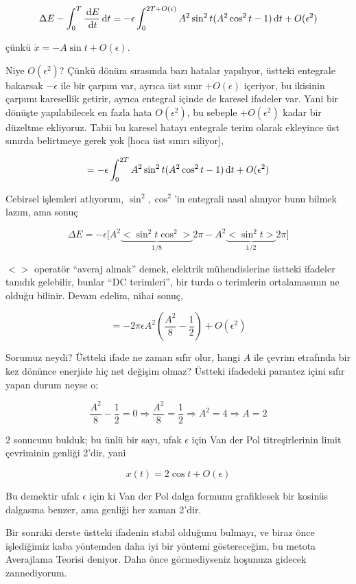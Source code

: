 \documentclass[12pt,fleqn]{article}\usepackage{../../common}
\begin{document}
$$
\Delta E - \int _{0}^{T} \frac{\,\mathrm{d} E}{\,\mathrm{d} t} \,\mathrm{d} t =
-\epsilon \int _{0}^{2T +O(\epsilon)} A^2 \sin^2 t(A^2\cos^2 t - 1) \,\mathrm{d} t + O(\epsilon^2)
$$

çünkü $\dot{x} = -A\sin t + O(\epsilon)$. 

Niye $O(\epsilon^2)$? Çünkü dönüm sırasında bazı hatalar yapılıyor, üstteki
entegrale bakarsak $-\epsilon$ ile bir çarpım var, ayrıca üst sınır
$+O(\epsilon)$ içeriyor, bu ikisinin çarpımı karesellik getirir, ayrıca entegral
içinde de karesel ifadeler var. Yani bir dönüşte yapılabilecek en fazla hata
$O(\epsilon^2)$, bu sebeple $+O(\epsilon^2)$ kadar bir düzeltme ekliyoruz. Tabii
bu karesel hatayı entegrale terim olarak ekleyince üst sınırda belirtmeye gerek
yok [hoca üst sınırı siliyor],

$$ = -\epsilon \int _{0}^{2T} A^2 \sin^2 t(A^2\cos^2 t - 1) \,\mathrm{d} t + O(\epsilon^2) $$

Cebirsel işlemleri atlıyorum, $\sin^2, \cos^2$'in entegrali nasıl alınıyor bunu
bilmek lazım, ama sonuç

$$ \Delta E = -\epsilon
\bigg[
A^2 \underbrace{<\sin^2 t \cos^2>}_{1/8} 2\pi - A^2 \underbrace{<\sin^2 t>}_{1/2} 2\pi
\bigg]
$$

$<>$ operatör ``averaj almak'' demek, elektrik mühendislerine üstteki ifadeler
tanıdık gelebilir, bunlar ``DC terimleri'', bir turda o terimlerin ortalamasının
ne olduğu bilinir. Devam edelim, nihai sonuç,

$$ = -2\pi \epsilon A^2 (\frac{A^2}{8}-\frac{1}{2}) + O(\epsilon^2) $$

Sorumuz neydi? Üstteki ifade ne zaman sıfır olur, hangi $A$ ile çevrim etrafında
bir kez dönünce enerjide hiç net değişim olmaz? Üstteki ifadedeki parantez içini
sıfır yapan durum neyse o; 

$$ \frac{A^2}{8}-\frac{1}{2} = 0 \Rightarrow \frac{A^2}{8} = \frac{1}{2}
\Rightarrow A^2 = 4 \Rightarrow A = 2
$$

2 sonucunu bulduk; bu ünlü bir sayı, ufak $\epsilon$ için Van der Pol
titreşirlerinin limit çevriminin genliği 2'dir, yani

$$ x(t) = 2 \cos t + O(\epsilon) $$

Bu demektir ufak $\epsilon$ için ki Van der Pol dalga formunu grafiklesek bir
kosinüs dalgasına benzer, ama genliği her zaman 2'dir.

Bir sonraki derste üstteki ifadenin stabil olduğunu bulmayı, ve biraz önce
işlediğimiz kaba yöntemden daha iyi bir yöntemi göstereceğim, bu metota
Averajlama Teorisi deniyor. Daha önce görmediyseniz hoşunuza gidecek
zannediyorum.
\end{document}
